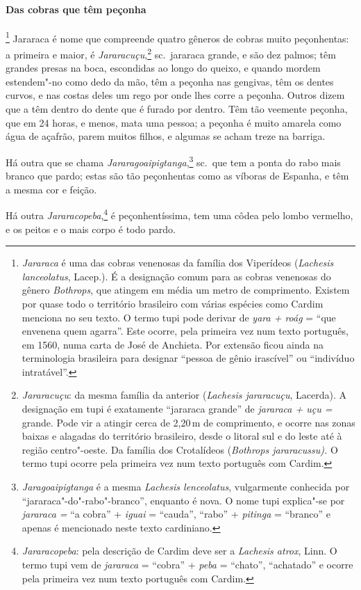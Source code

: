 \begin{linenumbers}
\paragraph{Das cobras que têm peçonha}\quad
{}\footnote{ \textit{Jararaca} é uma das cobras
venenosas da família dos Viperídeos (\textit{Lachesis lanceolatus}, 
Lacep.). É a designação comum para as cobras venenosas do gênero
\textit{Bothrops}, que atingem em média um metro de comprimento.
Existem por quase todo o território brasileiro com várias espécies como
Cardim menciona no seu texto. O termo tupi pode derivar de \textit{yara
+ roág} = ``que envenena quem agarra''. Este ocorre, pela primeira vez 
num texto português, em 1560, numa carta de José de Anchieta.
Por extensão ficou ainda na terminologia brasileira para designar
``pessoa de gênio irascível'' ou ``indivíduo intratável''.} 
Jararaca é nome que compreende quatro gêneros de cobras muito
peçonhentas: a primeira e maior, é \textit{Jararacuçu},\footnote{ \textit{Jararacuçu}: 
da mesma família da anterior (\textit{Lachesis
jararacuçu}, Lacerda). A designação em tupi é exatamente ``jararaca
grande'' de \textit{jararaca + uçu =} grande. Pode vir a atingir cerca
de 2,20\,m de comprimento, e ocorre nas zonas baixas e alagadas do
território brasileiro, desde o litoral sul e do leste até à região
centro"-oeste. Da família dos Crotalídeos (\textit{Bothrops
jararacussu).} O termo tupi ocorre pela primeira vez num texto português
com Cardim.} sc.~jararaca grande, e são dez palmos; têm grandes presas
na boca, escondidas ao longo do queixo, e quando mordem estendem"-no
como dedo da mão, têm a peçonha nas gengivas, têm os dentes curvos, e
nas costas deles um rego por onde lhes corre a peçonha. Outros dizem
que a têm dentro do dente que é furado por dentro. Têm tão veemente
peçonha, que em 24 horas, e menos, mata uma pessoa; a peçonha é muito
amarela como água de açafrão, parem muitos filhos, e algumas se acham
treze na barriga.

 Há outra que se chama \textit{Jararagoaipigtanga},\footnote{ \textit{Jaragoaipigtanga} 
é a mesma \textit{Lachesis lenceolatus}, vulgarmente conhecida por ``jararaca"-do"-rabo"-branco'', enquanto é nova.
O nome tupi explica"-se por \textit{jararaca =} ``a cobra'' + \textit{iguai} = 
``cauda'', ``rabo'' + \textit{pitinga} = ``branco'' e apenas é
mencionado neste texto cardiniano.} sc.~que tem a ponta do rabo mais
branco que pardo; estas são tão peçonhentas como as víboras de Espanha,
e têm a mesma cor e feição.

 Há outra \textit{Jararacopeba},\footnote{ \textit{Jararacopeba}: pela
descrição de Cardim deve ser a \textit{Lachesis atrox}, Linn. O termo
tupi vem de \textit{jararaca} = ``cobra'' + \textit{peba} = 
``chato'', ``achatado'' e ocorre pela primeira vez num
texto português com Cardim.} é peçonhentíssima, tem uma côdea pelo
lombo vermelho, e os peitos e o mais corpo é todo pardo.


\end{linenumbers}

